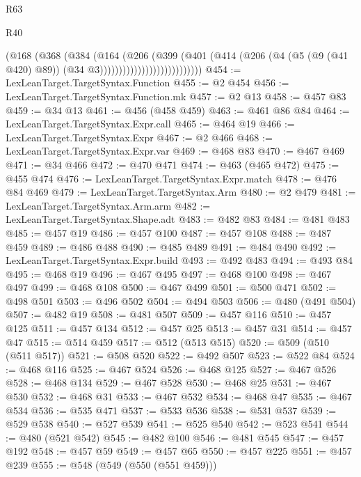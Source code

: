 \begin{lexlean}{R63}
\begin{lexlean}{R40}
\begin{coremodule}
{{{{{{{{{{{{{{{{{{{{{{{{{{{{{{{{{{{{{{{{{{{{{{{{{{{{{{{{{{{{{{{{{{{{{{{{{{{{{{{{{{{{{{{{{{{{{{{{{{{{{{{{{{{{{                                    (@168
                                      (@368
                                        (@384
                                          (@164
                                            (@206
                                              (@399
                                                (@401
                                                  (@414
                                                    (@206
                                                      (@4
                                                        (@5 (@9 (@41 @420) @89))
                                                        (@34 @3)))))))))))))))))))))))))))
@454 := LexLeanTarget.TargetSyntax.Function
@455 := @2 @454
@456 := LexLeanTarget.TargetSyntax.Function.mk
@457 := @2 @13
@458 := @457 @83
@459 := @34 @13
@461 := @456 (@458 @459)
@463 := @461 @86 @84
@464 := LexLeanTarget.TargetSyntax.Expr.call
@465 := @464 @19
@466 := LexLeanTarget.TargetSyntax.Expr
@467 := @2 @466
@468 := LexLeanTarget.TargetSyntax.Expr.var
@469 := @468 @83
@470 := @467 @469
@471 := @34 @466
@472 := @470 @471
@474 := @463 (@465 @472)
@475 := @455 @474
@476 := LexLeanTarget.TargetSyntax.Expr.match
@478 := @476 @84 @469
@479 := LexLeanTarget.TargetSyntax.Arm
@480 := @2 @479
@481 := LexLeanTarget.TargetSyntax.Arm.arm
@482 := LexLeanTarget.TargetSyntax.Shape.adt
@483 := @482 @83
@484 := @481 @483
@485 := @457 @19
@486 := @457 @100
@487 := @457 @108
@488 := @487 @459
@489 := @486 @488
@490 := @485 @489
@491 := @484 @490
@492 := LexLeanTarget.TargetSyntax.Expr.build
@493 := @492 @483
@494 := @493 @84
@495 := @468 @19
@496 := @467 @495
@497 := @468 @100
@498 := @467 @497
@499 := @468 @108
@500 := @467 @499
@501 := @500 @471
@502 := @498 @501
@503 := @496 @502
@504 := @494 @503
@506 := @480 (@491 @504)
@507 := @482 @19
@508 := @481 @507
@509 := @457 @116
@510 := @457 @125
@511 := @457 @134
@512 := @457 @25
@513 := @457 @31
@514 := @457 @47
@515 := @514 @459
@517 := @512 (@513 @515)
@520 := @509 (@510 (@511 @517))
@521 := @508 @520
@522 := @492 @507
@523 := @522 @84
@524 := @468 @116
@525 := @467 @524
@526 := @468 @125
@527 := @467 @526
@528 := @468 @134
@529 := @467 @528
@530 := @468 @25
@531 := @467 @530
@532 := @468 @31
@533 := @467 @532
@534 := @468 @47
@535 := @467 @534
@536 := @535 @471
@537 := @533 @536
@538 := @531 @537
@539 := @529 @538
@540 := @527 @539
@541 := @525 @540
@542 := @523 @541
@544 := @480 (@521 @542)
@545 := @482 @100
@546 := @481 @545
@547 := @457 @192
@548 := @457 @59
@549 := @457 @65
@550 := @457 @225
@551 := @457 @239
@555 := @548 (@549 (@550 (@551 @459)))
}}}}}}}}}}}}}}}}}}}}}}}}}}}}}}}}}}}}}}}}}}}}}}}}}}}}}}}}}}}}}}}}}}}}}}}}}}}}}}}}}}}}}}}}}}}}}}}}}}}}}}}}}}}}}
\end{coremodule}
\end{lexlean}
\end{lexlean}
